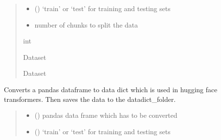 \documentclass[letterpaper,10pt,english]{sphinxmanual}
\begin{document}
\begin{fulllineitems}
\begin{fulllineitems}
\begin{quote}
\begin{description}
\begin{itemize}
\item {} 
\sphinxAtStartPar
{} () \textendash{} ‘train’ or ‘test’ for training and testing sets

\item {} 
\sphinxAtStartPar
{} \textendash{} number of chunks to split the data

\end{itemize}

\sphinxAtStartPar
int

\sphinxAtStartPar
Dataset

\sphinxAtStartPar
Dataset

\end{description}\end{quote}

\end{fulllineitems}


\begin{fulllineitems}
\label{\detokenize{BeeClassification:BeeClassification.BeeClassification.dataframe_to_dataset_split_save}}
\pysigstartsignatures
{}
\pysigstopsignatures
\sphinxAtStartPar
Converts a pandas dataframe to data dict which is used in hugging face transformers. Then saves the data to the datadict\_folder.
\begin{quote}\begin{description}
\begin{itemize}
\item {} 
\sphinxAtStartPar
{} () \textendash{} pandas data frame which has to be converted

\item {} 
\sphinxAtStartPar
{} () \textendash{} ‘train’ or ‘test’ for training and testing sets


\end{itemize}
\end{description}
\end{quote}
\end{fulllineitems}
\end{fulllineitems}
\end{document}
